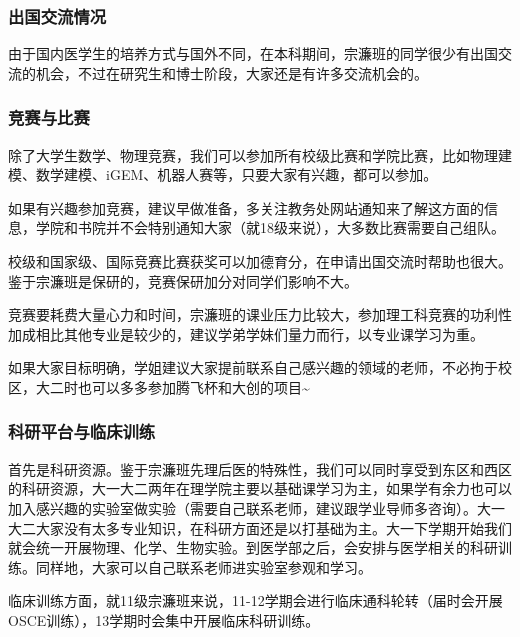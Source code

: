 \documentclass[
decoration,  %
]{qyxf-book}
\begin{document}
\hypertarget{ux51faux56fdux4ea4ux6d41ux60c5ux51b5}{%
	\subsubsection{出国交流情况}\label{ux51faux56fdux4ea4ux6d41ux60c5ux51b5}}

由于国内医学生的培养方式与国外不同，在本科期间，宗濂班的同学很少有出国交流的机会，不过在研究生和博士阶段，大家还是有许多交流机会的。

\hypertarget{ux7adeux8d5bux4e0eux6bd4ux8d5b}{%
	\subsubsection{竞赛与比赛}\label{ux7adeux8d5bux4e0eux6bd4ux8d5b}}

除了大学生数学、物理竞赛，我们可以参加所有校级比赛和学院比赛，比如物理建模、数学建模、iGEM、机器人赛等，只要大家有兴趣，都可以参加。

如果有兴趣参加竞赛，建议早做准备，多关注教务处网站通知来了解这方面的信息，学院和书院并不会特别通知大家（就18级来说），大多数比赛需要自己组队。

校级和国家级、国际竞赛比赛获奖可以加德育分，在申请出国交流时帮助也很大。鉴于宗濂班是保研的，竞赛保研加分对同学们影响不大。

竞赛要耗费大量心力和时间，宗濂班的课业压力比较大，参加理工科竞赛的功利性加成相比其他专业是较少的，建议学弟学妹们量力而行，以专业课学习为重。

如果大家目标明确，学姐建议大家提前联系自己感兴趣的领域的老师，不必拘于校区，大二时也可以多多参加腾飞杯和大创的项目\textasciitilde{}

\hypertarget{ux79d1ux7814ux5e73ux53f0ux4e0eux4e34ux5e8aux8badux7ec3}{%
	\subsubsection{科研平台与临床训练}\label{ux79d1ux7814ux5e73ux53f0ux4e0eux4e34ux5e8aux8badux7ec3}}

首先是科研资源。鉴于宗濂班先理后医的特殊性，我们可以同时享受到东区和西区的科研资源，大一大二两年在理学院主要以基础课学习为主，如果学有余力也可以加入感兴趣的实验室做实验（需要自己联系老师，建议跟学业导师多咨询）。大一大二大家没有太多专业知识，在科研方面还是以打基础为主。大一下学期开始我们就会统一开展物理、化学、生物实验。到医学部之后，会安排与医学相关的科研训练。同样地，大家可以自己联系老师进实验室参观和学习。

临床训练方面，就11级宗濂班来说，11-12学期会进行临床通科轮转（届时会开展OSCE训练），13学期时会集中开展临床科研训练。
\end{document}
